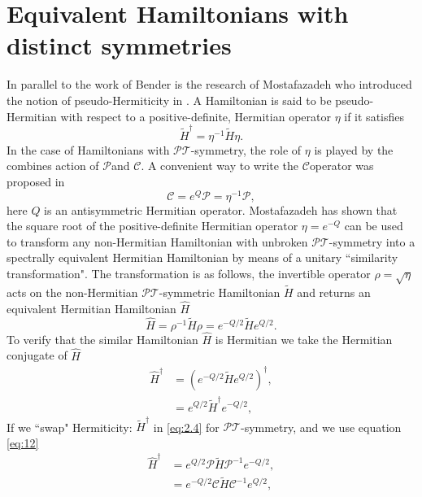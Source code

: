 \documentclass[12pt, a4paper]{report}
\newcommand\PT{\(\mathcal{PT}\)}
\newcommand\PP{\(\mathcal{P}\)}
\newcommand\CC{\(\mathcal{C}\)}
\begin{document}
\section*{Equivalent Hamiltonians with distinct symmetries}\label{}
In parallel to the work of Bender is the research of Mostafazadeh who introduced the notion of pseudo-Hermiticity in \cite{Mostafazadeh}. A Hamiltonian is said to be pseudo-Hermitian with respect to a positive-definite, Hermitian operator $\eta$ if it satisfies
\begin{equation}\label{eq:2.1}
\tilde{H}^{\dagger}  = \eta^{-1}\tilde{H}\eta.
\end{equation}
In the case of Hamiltonians with \PT-symmetry, the role of $\eta$ is played by the combines action of \PP\:and \CC. A convenient way to write the \CC\:operator was proposed in \cite{Bender_2006} 
\begin{equation}\label{eq:2.2}
\mathcal{C} = e^{Q}\mathcal{P} = \eta^{-1}\mathcal{P} ,
\end{equation}
here $Q$ is an antisymmetric Hermitian operator. Mostafazadeh \cite{Mostafazadeh2} has shown that the square root of the positive-definite Hermitian operator $\eta = e^{-Q}$ can be used to transform any non-Hermitian Hamiltonian with unbroken \PT-symmetry into a spectrally equivalent Hermitian Hamiltonian by means of a unitary ``similarity transformation"\cite{PTvsDH}\cite{Jones_2005}. The transformation is as follows, the invertible operator $\rho = \sqrt{\eta}$ acts on the non-Hermitian \PT-symmetric Hamiltonian $\tilde{H}$ and returns an equivalent Hermitian Hamiltonian $\hat{H}$
\begin{equation}\label{eq:2.3}
\hat{H} = \rho^{-1}\tilde{H}\rho = e^{-Q/2}\tilde{H}e^{Q/2}.
\end{equation}
To verify that the similar Hamiltonian $\hat{H}$ is Hermitian we take the Hermitian conjugate of $\hat{H}$
\begin{align}\label{eq:2.4}
\hat{H}^{\dagger} &= (e^{-Q/2}\tilde{H}e^{Q/2})^{\dagger}\nonumber,\\
& = e^{Q/2}\tilde{H}^{\dagger}e^{-Q/2},
\end{align}
If we ``swap" Hermiticity: $\tilde{H}^{\dagger}$ in \ref{eq:2.4} for \PT-symmetry, and we use equation \ref{eq:12}
\begin{align}\label{eq:2.5}
\hat{H}^{\dagger} &= e^{Q/2}\mathcal{P}\tilde{H}\mathcal{P}^{-1}e^{-Q/2}\nonumber,\\
&= e^{-Q/2}\mathcal{C}\tilde{H}\mathcal{C}^{-1}e^{Q/2},
\end{align}
\end{document}
